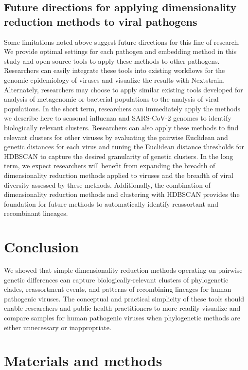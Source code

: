 \documentclass[10pt,letterpaper]{article}
\begin{document}
\subsection*{Future directions for applying dimensionality reduction methods to viral pathogens}

Some limitations noted above suggest future directions for this line of research.
We provide optimal settings for each pathogen and embedding method in this study and open source tools to apply these methods to other pathogens.
Researchers can easily integrate these tools into existing workflows for the genomic epidemiology of viruses and visualize the results with Nextstrain.
Alternately, researchers may choose to apply similar existing tools developed for analysis of metagenomic or bacterial populations \cite{Schloss2009,Schloss2020,Bolyen2019,McMurdie2013,Lees2019} to the analysis of viral populations.
In the short term, researchers can immediately apply the methods we describe here to seasonal influenza and SARS-CoV-2 genomes to identify biologically relevant clusters.
Researchers can also apply these methods to find relevant clusters for other viruses by evaluating the pairwise Euclidean and genetic distances for each virus and tuning the Euclidean distance thresholds for HDBSCAN to capture the desired granularity of genetic clusters.
In the long term, we expect researchers will benefit from expanding the breadth of dimensionality reduction methods applied to viruses and the breadth of viral diversity assessed by these methods.
Additionally, the combination of dimensionality reduction methods and clustering with HDBSCAN provides the foundation for future methods to automatically identify reassortant and recombinant lineages.

\section*{Conclusion}

We showed that simple dimensionality reduction methods operating on pairwise genetic differences can capture biologically-relevant clusters of phylogenetic clades, reassortment events, and patterns of recombining lineages for human pathogenic viruses.
The conceptual and practical simplicity of these tools should enable researchers and public health practitioners to more readily visualize and compare samples for human pathogenic viruses when phylogenetic methods are either unnecessary or inappropriate.

\section*{Materials and methods}
\end{document}
